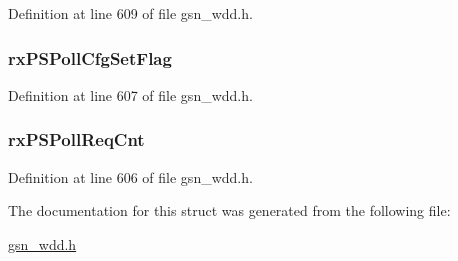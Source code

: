 Definition at line 609 of file gsn\_\-wdd.h.

\hypertarget{a00283_a95f3bbf9ee9798a1df6a44a639127d06}{
\subsubsection[{rxPSPollCfgSetFlag}]{ {\bf rxPSPollCfgSetFlag}}}
\label{a00283_a95f3bbf9ee9798a1df6a44a639127d06}


Definition at line 607 of file gsn\_\-wdd.h.

\hypertarget{a00283_ae1c83e85aa9154a9e18cc1c67b25eceb}{
\subsubsection[{rxPSPollReqCnt}]{ {\bf rxPSPollReqCnt}}}
\label{a00283_ae1c83e85aa9154a9e18cc1c67b25eceb}


Definition at line 606 of file gsn\_\-wdd.h.



The documentation for this struct was generated from the following file:\begin{DoxyCompactItemize}
\item 
\hyperlink{a00603}{gsn\_\-wdd.h}\end{DoxyCompactItemize}
